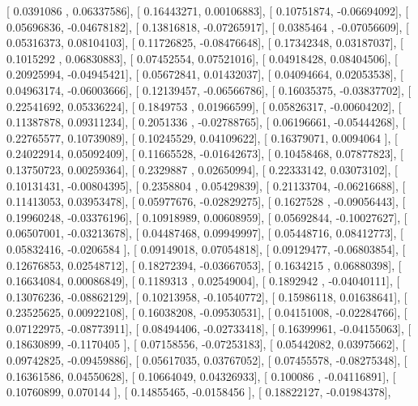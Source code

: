 \documentclass{article}
\begin{document}
       [ 0.0391086 ,  0.06337586],
       [ 0.16443271,  0.00106883],
       [ 0.10751874, -0.06694092],
       [ 0.05696836, -0.04678182],
       [ 0.13816818, -0.07265917],
       [ 0.0385464 , -0.07056609],
       [ 0.05316373,  0.08104103],
       [ 0.11726825, -0.08476648],
       [ 0.17342348,  0.03187037],
       [ 0.1015292 ,  0.06830883],
       [ 0.07452554,  0.07521016],
       [ 0.04918428,  0.08404506],
       [ 0.20925994, -0.04945421],
       [ 0.05672841,  0.01432037],
       [ 0.04094664,  0.02053538],
       [ 0.04963174, -0.06003666],
       [ 0.12139457, -0.06566786],
       [ 0.16035375, -0.03837702],
       [ 0.22541692,  0.05336224],
       [ 0.1849753 ,  0.01966599],
       [ 0.05826317, -0.00604202],
       [ 0.11387878,  0.09311234],
       [ 0.2051336 , -0.02788765],
       [ 0.06196661, -0.05444268],
       [ 0.22765577,  0.10739089],
       [ 0.10245529,  0.04109622],
       [ 0.16379071,  0.0094064 ],
       [ 0.24022914,  0.05092409],
       [ 0.11665528, -0.01642673],
       [ 0.10458468,  0.07877823],
       [ 0.13750723,  0.00259364],
       [ 0.2329887 ,  0.02650994],
       [ 0.22333142,  0.03073102],
       [ 0.10131431, -0.00804395],
       [ 0.2358804 ,  0.05429839],
       [ 0.21133704, -0.06216688],
       [ 0.11413053,  0.03953478],
       [ 0.05977676, -0.02829275],
       [ 0.1627528 , -0.09056443],
       [ 0.19960248, -0.03376196],
       [ 0.10918989,  0.00608959],
       [ 0.05692844, -0.10027627],
       [ 0.06507001, -0.03213678],
       [ 0.04487468,  0.09949997],
       [ 0.05448716,  0.08412773],
       [ 0.05832416, -0.0206584 ],
       [ 0.09149018,  0.07054818],
       [ 0.09129477, -0.06803854],
       [ 0.12676853,  0.02548712],
       [ 0.18272394, -0.03667053],
       [ 0.1634215 ,  0.06880398],
       [ 0.16634084,  0.00086849],
       [ 0.1189313 ,  0.02549004],
       [ 0.1892942 , -0.04040111],
       [ 0.13076236, -0.08862129],
       [ 0.10213958, -0.10540772],
       [ 0.15986118,  0.01638641],
       [ 0.23525625,  0.00922108],
       [ 0.16038208, -0.09530531],
       [ 0.04151008, -0.02284766],
       [ 0.07122975, -0.08773911],
       [ 0.08494406, -0.02733418],
       [ 0.16399961, -0.04155063],
       [ 0.18630899, -0.1170405 ],
       [ 0.07158556, -0.07253183],
       [ 0.05442082,  0.03975662],
       [ 0.09742825, -0.09459886],
       [ 0.05617035,  0.03767052],
       [ 0.07455578, -0.08275348],
       [ 0.16361586,  0.04550628],
       [ 0.10664049,  0.04326933],
       [ 0.100086  , -0.04116891],
       [ 0.10760899,  0.070144  ],
       [ 0.14855465, -0.0158456 ],
       [ 0.18822127, -0.01984378],
\end{document}
